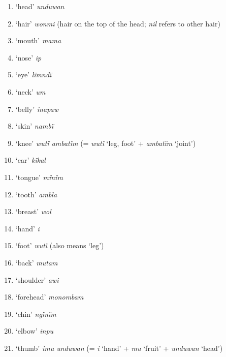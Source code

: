 \begin{enumerate}[noitemsep, label={\arabic*}, align=left, widest=190, labelsep=1ex,leftmargin=*]
\item  ‘head’ \textit{unduwan}

\item  ‘hair’ \textit{wonmi} (hair on the top of the head; \textit{nil} refers to other hair)

\item  ‘mouth’ \textit{mama}

\item  ‘nose’ \textit{ip}

\item  ‘eye’ \textit{lïmndï}

\item  ‘neck’ \textit{um}

\item  ‘belly’ \textit{inapaw}

\item  ‘skin’ \textit{nambï}

\item  ‘knee’ \textit{wutï ambatïm} (= \textit{wutï} ‘leg, foot’ + \textit{ambatïm} ‘joint’)

\item  ‘ear’ \textit{kïkal}

\item  ‘tongue’ \textit{mïnïm}

\item  ‘tooth’ \textit{ambla}

\item  ‘breast’ \textit{wol}

\item  ‘hand’ \textit{i}

\item  ‘foot’ \textit{wutï} (also means ‘leg’)

\item  ‘back’ \textit{mutam}

\item  ‘shoulder’ \textit{awi}

\item  ‘forehead’ \textit{monombam}

\item  ‘chin’ \textit{ngïnïm}

\item  ‘elbow’ \textit{inpu}

\item  ‘thumb’ \textit{imu unduwan} (= \textit{i} ‘hand’ + \textit{mu} ‘fruit’ + \textit{unduwan} ‘head’)


\end{enumerate}
